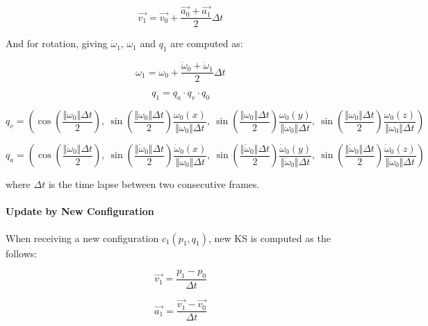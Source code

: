 \begin{equation}
\overrightarrow{v_{1}}=\overrightarrow{v_{0}}+\frac{\overrightarrow{a_{0}}+\overrightarrow{a_{1}}}{2}\Delta t
\end{equation}

And for rotation, giving $\dot{\omega}_{1}$, $\omega_{1}$ and $q_{1}$ are computed as:

\begin{equation}
\omega_{1}=\omega_{0}+\frac{\dot{\omega}_{0}+\dot{\omega}_{1}}{2}\Delta t
\end{equation}

\begin{equation}
q_{1}=q_{a} \cdot q_{v} \cdot q_{0}
\end{equation}

\begin{equation}
q_{v}=\left(\cos(\frac{\Vert\omega_{0}\Vert\Delta t}{2}),\:\sin(\frac{\Vert\omega_{0}\Vert\Delta t}{2})\frac{\omega_{0}(x)}{\Vert\omega_{0}\Vert\Delta t},\:\sin(\frac{\Vert\omega_{0}\Vert\Delta t}{2})\frac{\omega_{0}(y)}{\Vert\omega_{0}\Vert\Delta t},\:\sin(\frac{\Vert\omega_{0}\Vert\Delta t}{2})\frac{\omega_{0}(z)}{\Vert\omega_{0}\Vert\Delta t}\right)
\end{equation}

\begin{equation}
q_{a}=\left(\cos(\frac{\Vert\dot{\omega}_{0}\Vert\Delta t}{2}),\:\sin(\frac{\Vert\dot{\omega}_{0}\Vert\Delta t}{2})\frac{\dot{\omega}_{0}(x)}{\Vert\dot{\omega}_{0}\Vert\Delta t},\:\sin(\frac{\Vert\dot{\omega}_{0}\Vert\Delta t}{2})\frac{\dot{\omega}_{0}(y)}{\Vert\dot{\omega}_{0}\Vert\Delta t},\:\sin(\frac{\Vert\dot{\omega}_{0}\Vert\Delta t}{2})\frac{\dot{\omega}_{0}(z)}{\Vert\dot{\omega}_{0}\Vert\Delta t}\right)
\end{equation}

where $\Delta t$ is the time lapse between two consecutive frames.

\paragraph{Update by New Configuration}
When receiving a new configuration $c_{1}(p_{1},q_{1})$, new KS is computed as the follows:

\begin{equation}
\overrightarrow{v_{1}}=\frac{p_{1}-p_{0}}{\Delta t}
\end{equation}

\begin{equation}
\overrightarrow{a_{1}}=\frac{\overrightarrow{v_{1}}-\overrightarrow{v_{0}}}{\Delta t}
\end{equation}

